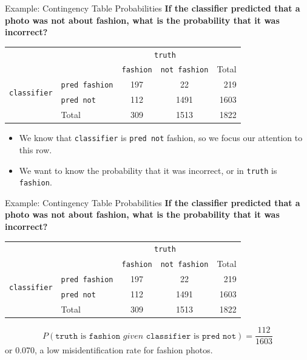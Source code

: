 \begin{frame}{Example: Contingency Table Probabilities}
    \textbf{If the classifier predicted that a photo was not about fashion, what is the probability that it was incorrect?}
    \begin{center}
        \begin{tabular}{r l cc r}
		& & \multicolumn{2}{c}{{\texttt{truth}}} & \\
        \cline{3-4}
		& & \texttt{fashion} & \texttt{not fashion} & Total  \\ 
        \cline{2-5}
        \multirow{2}{*}{{\texttt{classifier}}} 
        & \texttt{pred fashion}   & 197 & 22 & 219 \\ 
  		& \texttt{pred not}       & 112 & 1491 & 1603 \\ 
        \cline{2-5}
  		& Total	& 309 & 1513 & 1822 \\
        \cline{2-5}
    \end{tabular}
    \end{center}
    \begin{itemize}
        \item We know that \texttt{classifier} is \texttt{pred not} fashion, so we focus our attention to this row.
        \item We want to know the probability that it was incorrect, or in \texttt{truth} is \texttt{fashion}.
    \end{itemize}
\end{frame}

\begin{frame}{Example: Contingency Table Probabilities}
    \textbf{If the classifier predicted that a photo was not about fashion, what is the probability that it was incorrect?}
    \begin{center}
        \begin{tabular}{r l cc r}
		& & \multicolumn{2}{c}{{\texttt{truth}}} & \\
        \cline{3-4}
		& & \texttt{fashion} & \texttt{not fashion} & Total  \\ 
        \cline{2-5}
        \multirow{2}{*}{{\texttt{classifier}}} 
        & \texttt{pred fashion}   & 197 & 22 & 219 \\ 
  		& \texttt{pred not}       & 112 & 1491 & 1603 \\ 
        \cline{2-5}
  		& Total	& 309 & 1513 & 1822 \\
        \cline{2-5}
    \end{tabular}
    \end{center}
    \[
    P(\texttt{truth}\text{ is }\texttt{fashion}\textit{ given }\texttt{classifier}\text{ is }\texttt{pred not}) = \frac{112}{1603}
    \]
    or 0.070, a low misidentification rate for fashion photos. 
\end{frame}

